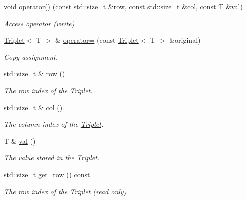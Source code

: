 \begin{DoxyCompactItemize}
void \hyperlink{classLuna_1_1Triplet_a8432f4643175af9ef2cf3054f0284693}{operator()} (const std\+::size\+\_\+t \&\hyperlink{classLuna_1_1Triplet_aea4263baad8dcba4eb238c404f1ad2e7}{row}, const std\+::size\+\_\+t \&\hyperlink{classLuna_1_1Triplet_a5797cd45bf76a6baf60f7aa4741ffec2}{col}, const T \&\hyperlink{classLuna_1_1Triplet_a622ca1a37e1661cb4e2a5932fb6806a9}{val})
\begin{DoxyCompactList}\small\item\em Access operator (write) \end{DoxyCompactList}\item 
\hyperlink{classLuna_1_1Triplet}{Triplet}$<$ T $>$ \& \hyperlink{classLuna_1_1Triplet_accc460545742021e7c723e5c2db7338f}{operator=} (const \hyperlink{classLuna_1_1Triplet}{Triplet}$<$ T $>$ \&original)
\begin{DoxyCompactList}\small\item\em Copy assignment. \end{DoxyCompactList}\item 
std\+::size\+\_\+t \& \hyperlink{classLuna_1_1Triplet_aea4263baad8dcba4eb238c404f1ad2e7}{row} ()
\begin{DoxyCompactList}\small\item\em The row index of the \hyperlink{classLuna_1_1Triplet}{Triplet}. \end{DoxyCompactList}\item 
std\+::size\+\_\+t \& \hyperlink{classLuna_1_1Triplet_a5797cd45bf76a6baf60f7aa4741ffec2}{col} ()
\begin{DoxyCompactList}\small\item\em The column index of the \hyperlink{classLuna_1_1Triplet}{Triplet}. \end{DoxyCompactList}\item 
T \& \hyperlink{classLuna_1_1Triplet_a622ca1a37e1661cb4e2a5932fb6806a9}{val} ()
\begin{DoxyCompactList}\small\item\em The value stored in the \hyperlink{classLuna_1_1Triplet}{Triplet}. \end{DoxyCompactList}\item 
std\+::size\+\_\+t \hyperlink{classLuna_1_1Triplet_a78f98c86e79867cccbf5429945366036}{get\+\_\+row} () const
\begin{DoxyCompactList}\small\item\em The row index of the \hyperlink{classLuna_1_1Triplet}{Triplet} (read only) \end{DoxyCompactList}\item 

\end{DoxyCompactItemize}
